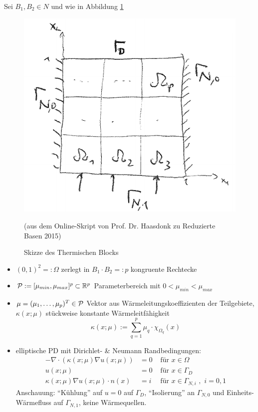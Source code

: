 \begin{bsp} \label{2.10}
Sei $B_1, B_2 \in N$ und wie in Abbildung \ref{fig:ThermischerBlock} 

\begin{figure}[H]
  \centering\small
    \includegraphics[width = 0.4 \textwidth]{Bilder/ThermischerBlock.png}
  \caption{Skizze des Thermischen Blocks}{(aus dem Online-Skript von Prof. Dr. Haasdonk zu Reduzierte Basen 2015)}
  \label{fig:ThermischerBlock}
\end{figure}

\begin{itemize}
	\item $(0,1)^2=: \Omega$ zerlegt in $B_1 \cdot B_2 =: p$ kongruente Rechtecke
	\item $\mathcal{P} := [\mu_{min}, \mu_{max}]^p \subset \mathbb{R}^p$ Parameterbereich mit $0 < \mu_{min} < \mu_{max}$
	\item $\mu = (\mu_1,\dots,\mu_p)^T \in \mathcal{P}$ Vektor aus Wärmeleitungskoeffizienten der Teilgebiete, $\kappa(x;\mu)$ stückweise konstante Wärmeleitfähigkeit
	\[
		\kappa(x;\mu) := \sum\limits_{q=1}^p \mu_q \cdot \chi_{\Omega_q}(x)
	\]
	\item elliptische PD mit Dirichlet- \& Neumann Randbedingungen:
	\begin{align*}
	- \nabla \cdot (\kappa(x;\mu) \nabla u(x;\mu)) &= 0 &\text{ für } x \in \Omega \\
	u (x;\mu) &= 0 &\text{ für } x \in \Gamma_D \\
	\kappa(x;\mu) \nabla u(x;\mu) \cdot n(x) &= i &\text{ für } x \in \Gamma_{N,i} \,\, , \, \, i=0,1
	\end{align*}
	Anschauung: ``Kühlung'' auf $u=0$ auf $\Gamma_D$, ``Isolierung'' an $\Gamma_{N,0}$ und Einheits-Wärmefluss auf $\Gamma_{N,1}$, keine Wärmequellen.
	

\end{itemize}
\end{bsp}
